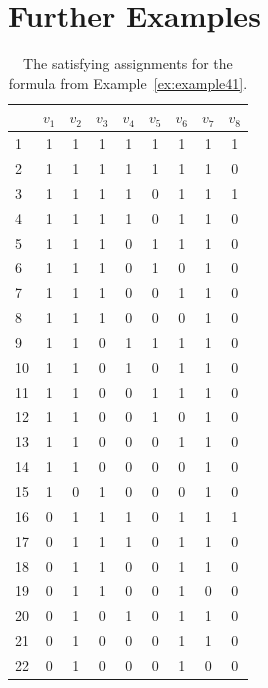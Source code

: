 \documentclass[a4paper, 12pt, bibliography=totoc]{scrartcl}
\begin{document}
\section{Further Examples}\label{app:input}

\lstset{numbers=none}

\begin{table}[ht]
	\centering
	\begin{tabular}{|l||c|c|c|c|c|c|c|c|}
		
		\hline
		&$v_{1}$ & $v_{2}$ & $v_{3}$ & $v_{4}$ & $v_{5}$ & $v_{6}$ & $v_{7}$ & $v_{8}$ \\
		\hline 
		1&1 & 1 & 1 & 1 & 1 & 1 & 1 & 1 \\
		2&1 & 1 & 1 & 1 & 1 & 1 & 1 & 0 \\
		3&1 & 1 & 1 & 1 & 0 & 1 & 1 & 1 \\
		4&1 & 1 & 1 & 1 & 0 & 1 & 1 & 0 \\
		5&1 & 1 & 1 & 0 & 1 & 1 & 1 & 0 \\
		6&1 & 1 & 1 & 0 & 1 & 0 & 1 & 0 \\
		7&1 & 1 & 1 & 0 & 0 & 1 & 1 & 0 \\
		8&1 & 1 & 1 & 0 & 0 & 0 & 1 & 0 \\
		9&1 & 1 & 0 & 1 & 1 & 1 & 1 & 0 \\
		10&1 & 1 & 0 & 1 & 0 & 1 & 1 & 0 \\
		11&1 & 1 & 0 & 0 & 1 & 1 & 1 & 0 \\
		12&1 & 1 & 0 & 0 & 1 & 0 & 1 & 0 \\
		13&1 & 1 & 0 & 0 & 0 & 1 & 1 & 0 \\
		14&1 & 1 & 0 & 0 & 0 & 0 & 1 & 0 \\
		15&1 & 0 & 1 & 0 & 0 & 0 & 1 & 0 \\
		16&0 & 1 & 1 & 1 & 0 & 1 & 1 & 1 \\
		17&0 & 1 & 1 & 1 & 0 & 1 & 1 & 0 \\
		18&0 & 1 & 1 & 0 & 0 & 1 & 1 & 0 \\
		19&0 & 1 & 1 & 0 & 0 & 1 & 0 & 0 \\
		20&0 & 1 & 0 & 1 & 0 & 1 & 1 & 0 \\
		21&0 & 1 & 0 & 0 & 0 & 1 & 1 & 0 \\
		22&0 & 1 & 0 & 0 & 0 & 1 & 0 & 0 \\
		\hline
	\end{tabular}
\caption{The satisfying assignments for the formula from Example~\ref{ex:example41}.}
\label{tab:ex41tabx}
\end{table}
\end{document}
